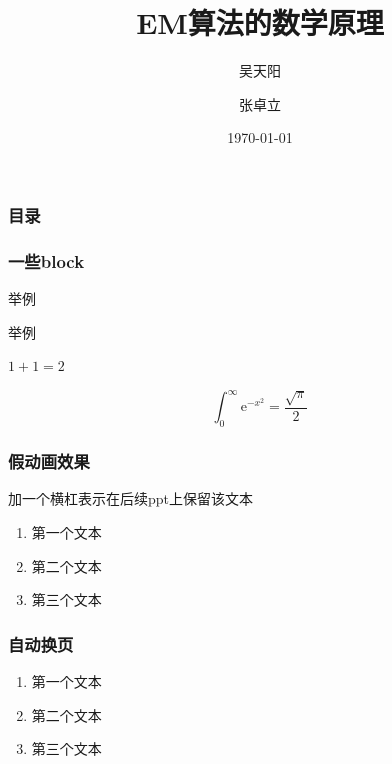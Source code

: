 \documentclass[UTF8]{ctexbeamer}
\title{EM算法的数学原理}
\author{吴天阳\and 张卓立}
\institute{XJTU\and 强基数学}
\date{\today}  %
\def\e{\mathrm{e}}          %
\begin{document}
\frame{\titlepage}  %

\begin{frame}  %
    \frametitle{目录}
    \tableofcontents
\end{frame}

\begin{frame}
    \frametitle{一些block}
    举例
    \begin{lemma}[一个引理]
        举例
    \end{lemma}
    \begin{definition}[一个定义]
        $1+1=2$
    \end{definition}
    \begin{theorem}[一个定理]
        \begin{equation*}
            \int_0^\infty \e^{-x^2} = \frac{\sqrt{\pi}}{2}
        \end{equation*}
    \end{theorem}
\end{frame}

\begin{frame}
    \frametitle{假动画效果}
    加一个横杠表示在后续ppt上保留该文本
    \begin{enumerate}
        \item<1-> 第一个文本
        \item<2> 第二个文本
        \item<3-> 第三个文本
    \end{enumerate}
\end{frame}

\begin{frame}
    \frametitle{自动换页}

    \begin{enumerate}[<+->]
        \item 第一个文本
        \item 第二个文本
        \item 第三个文本
    \end{enumerate}

\end{frame}
\end{document}
